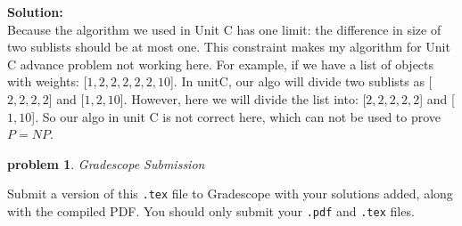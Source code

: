 \documentclass[10pt]{article}
\newcommand{\solution}[1]{\color{blue}\hfill\break\noindent\textbf{Solution:} #1\color{black}}
\newtheorem{problem}{\sc\color{cit}problem}
\begin{document}
\begin{enumerate}
  \solution{\\
  Because the algorithm we used in Unit C has one limit: the difference in size of two sublists should be at most one. This constraint makes my algorithm for Unit C advance problem not working here. For example, if we have a list of objects with weights: [$1, 2, 2, 2, 2, 2, 10$]. In unitC, our algo will divide two sublists as [$2, 2, 2, 2$] and [$1, 2, 10$]. However, here we will divide the list into: [$2, 2, 2, 2, 2$] and [$1, 10$]. So our algo in unit C is not correct here, which can not be used to prove $P=NP$.
  }
\end{enumerate}


\begin{problem} Gradescope Submission \end{problem}
Submit a version of this \verb|.tex| file to Gradescope with your solutions added, along with the compiled PDF.  You should only submit your \verb|.pdf| and \verb|.tex| files.
\end{document}

